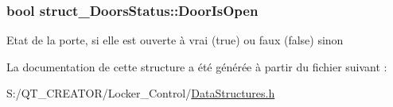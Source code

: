\subsubsection[{Door\+Is\+Open}]{\setlength{\rightskip}{0pt plus 5cm}bool struct\+\_\+\+Doors\+Status\+::\+Door\+Is\+Open}\label{structstruct___doors_status_a6c7607cfa6b784ec4558eff3cb48aeaa}
Etat de la porte, si elle est ouverte à vrai (true) ou faux (false) sinon 

La documentation de cette structure a été générée à partir du fichier suivant \+:\begin{DoxyCompactItemize}
\item 
S\+:/\+Q\+T\+\_\+\+C\+R\+E\+A\+T\+O\+R/\+Locker\+\_\+\+Control/\hyperlink{_data_structures_8h}{Data\+Structures.\+h}\end{DoxyCompactItemize}
